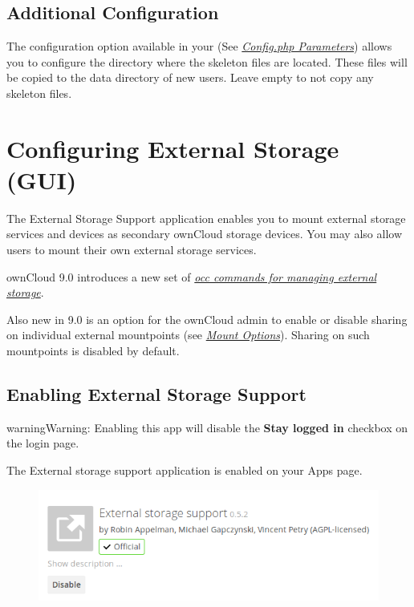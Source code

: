 \documentclass[letterpaper,10pt,english]{sphinxmanual}
\begin{document}
\subsection{Additional Configuration}
\label{configuration_files/default_files_configuration:additional-configuration}
The configuration option  available in your
 (See
{\hyperref[configuration_server/config_sample_php_parameters::doc]{\emph{Config.php Parameters}}}) allows
you to configure the directory where the skeleton files are located.
These files will be copied to the data directory of new users. Leave
empty to not copy any skeleton files.


\section{Configuring External Storage (GUI)}
\label{configuration_files/external_storage_configuration_gui::doc}\label{configuration_files/external_storage_configuration_gui:configuring-external-storage-gui}
The External Storage Support application enables you to mount external storage
services and devices as secondary ownCloud storage devices. You may also allow
users to mount their own external storage services.

ownCloud 9.0 introduces a new set of {\hyperref[configuration_server/occ_command:files-external-label]{\emph{occ commands for managing external storage}}}.

Also new in 9.0 is an option for the ownCloud admin to enable or disable sharing
on individual external mountpoints (see
{\hyperref[configuration_files/external_storage_configuration_gui:external-storage-mount-options-label]{\emph{Mount Options}}}). Sharing on such mountpoints is
disabled by default.


\subsection{Enabling External Storage Support}
\label{configuration_files/external_storage_configuration_gui:enabling-external-storage-support}
\begin{notice}{warning}{Warning:}
Enabling this app will disable the \textbf{Stay logged in} checkbox on the login page.
\end{notice}

The External storage support application is enabled on your Apps page.
\begin{figure}[htbp]
\centering

\includegraphics{enable-app.png}
\end{figure}
\end{document}
